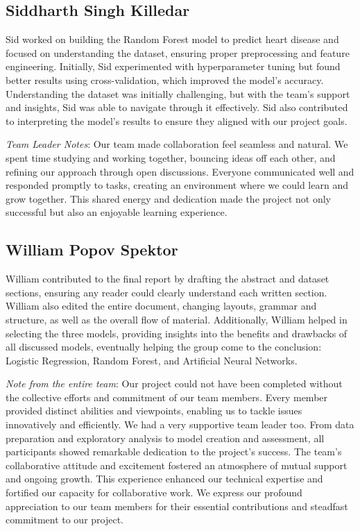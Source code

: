 \subsection{Siddharth Singh Killedar}
Sid worked on building the Random Forest model to predict heart disease and focused on understanding the dataset, ensuring proper preprocessing and feature engineering. Initially, Sid experimented with hyperparameter tuning but found better results using cross-validation, which improved the model's accuracy. Understanding the dataset was initially challenging, but with the team's support and insights, Sid was able to navigate through it effectively. Sid also contributed to interpreting the model's results to ensure they aligned with our project goals.

\textit{Team Leader Notes}: Our team made collaboration feel seamless and natural. We spent time studying and working together, bouncing ideas off each other, and refining our approach through open discussions. Everyone communicated well and responded promptly to tasks, creating an environment where we could learn and grow together. This shared energy and dedication made the project not only successful but also an enjoyable learning experience.

\subsection{William Popov Spektor}
William contributed to the final report by drafting the abstract and dataset sections, ensuring any reader could clearly understand each written section. William also edited the entire document, changing layouts, grammar and structure, as well as the overall flow of material. Additionally, William helped in selecting the three models, providing insights into the benefits and drawbacks of all discussed models, eventually helping the group come to the conclusion: Logistic Regression, Random Forest, and Artificial Neural Networks.


\textit{Note from the entire team}: Our project could not have been completed without the collective efforts and commitment of our team members. Every member provided distinct abilities and viewpoints, enabling us to tackle issues innovatively and efficiently. We had a very supportive team leader too. From data preparation and exploratory analysis to model creation and assessment, all participants showed remarkable dedication to the project's success.
The team's collaborative attitude and excitement fostered an atmosphere of mutual support and ongoing growth. This experience enhanced our technical expertise and fortified our capacity for collaborative work. We express our profound appreciation to our team members for their essential contributions and steadfast commitment to our project.
